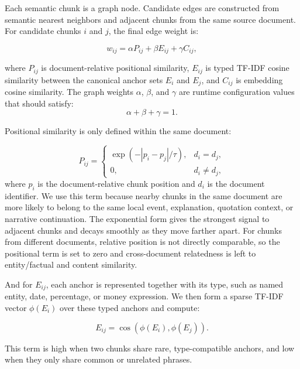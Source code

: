 \documentclass[11pt]{article}
\begin{document}
Each semantic chunk is a graph node. Candidate edges are constructed from semantic nearest neighbors and adjacent chunks from the same source document. For candidate chunks $i$ and $j$, the final edge weight is:

\begin{equation}
w_{ij} = \alpha P_{ij} + \beta E_{ij} + \gamma C_{ij},
\end{equation}

where $P_{ij}$ is document-relative positional similarity, $E_{ij}$ is typed TF-IDF cosine similarity between the canonical anchor sets $E_i$ and $E_j$, and $C_{ij}$ is embedding cosine similarity. The graph weights $\alpha$, $\beta$, and $\gamma$ are runtime configuration values that should satisfy:
\begin{equation}
\alpha + \beta + \gamma = 1.
\end{equation}

Positional similarity is only defined within the same document:

\begin{equation}
P_{ij} =
\begin{cases}
\exp(-|p_i - p_j| / \tau), & d_i = d_j, \\
0, & d_i \ne d_j,
\end{cases}
\end{equation}
where $p_i$ is the document-relative chunk position and $d_i$ is the document identifier. We use this term because nearby chunks in the same document are more likely to belong to the same local event, explanation, quotation context, or narrative continuation. The exponential form gives the strongest signal to adjacent chunks and decays smoothly as they move farther apart. For chunks from different documents, relative position is not directly comparable, so the positional term is set to zero and cross-document relatedness is left to entity/factual and content similarity. 

And for $E_{ij}$, each anchor is represented together with its type, such as named entity, date, percentage, or money expression. We then form a sparse TF-IDF vector $\phi(E_i)$ over these typed anchors and compute:

\begin{equation}
E_{ij} = \cos(\phi(E_i), \phi(E_j)).
\end{equation}

This term is high when two chunks share rare, type-compatible anchors, and low when they only share common or unrelated phrases. 
\end{document}
